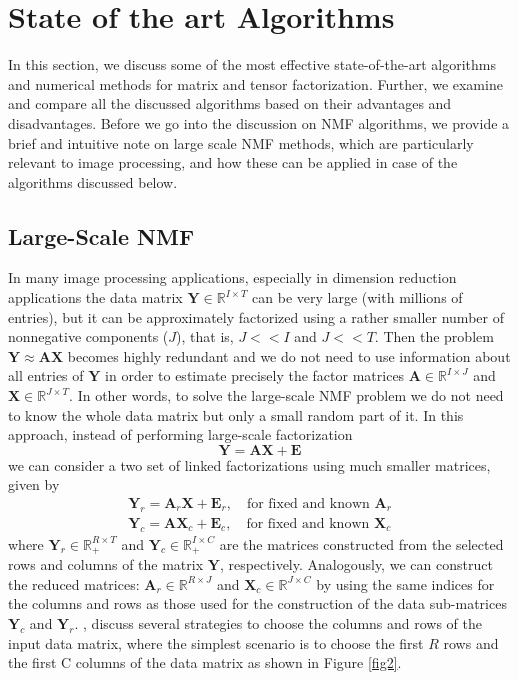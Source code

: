 \documentclass[11pt]{article}
\begin{document}
\section{State of the art Algorithms}
In this section, we discuss some of the most effective state-of-the-art algorithms and numerical methods for matrix and tensor factorization. Further, we examine and compare all the discussed algorithms based on their advantages and disadvantages. Before we go into the discussion on NMF algorithms, we provide a brief and intuitive note on large scale NMF methods, which are particularly relevant to image processing, and how these can be applied in case of the algorithms discussed below.

\subsection{Large-Scale NMF}
In many image processing applications, especially in dimension reduction applications the data matrix $\mathbf{Y} \in \mathbb{R}^{I \times T}$ can be very large (with millions of entries), but it can be approximately factorized using a rather smaller number of nonnegative components ($\mathit{J}$), that is, $\mathit{J} << I$ and $\mathit{J} << T$. Then the problem $\mathbf{Y} \approx \mathbf{AX}$ becomes highly redundant and we do not need to use information about all entries of $\mathbf{Y}$ in order to estimate precisely the factor matrices $\mathbf{A} \in \mathbb{R}^{I \times J}$ and $\mathbf{X} \in \mathbb{R}^{J \times T}$. In other words, to solve the large-scale NMF problem we do not need to know the whole data matrix but only a small random part of it. In this approach, instead of performing large-scale factorization $$\mathbf{Y} = \mathbf{AX} + \mathbf{E}$$
we can consider a two set of linked factorizations using much smaller matrices, given by
\begin{eqnarray*}
\mathbf{Y}_r = \mathbf{A}_r\mathbf{X} + \mathbf{E}_r, \quad \textrm{for fixed and known } \mathbf{A}_r \\
\mathbf{Y}_c = \mathbf{A}\mathbf{X}_c + \mathbf{E}_c, \quad \textrm{for fixed and known } \mathbf{X}_c
\end{eqnarray*}
where $\mathbf{Y}_r \in \mathbb{R}^{R \times T}_+$ and $\mathbf{Y}_c \in \mathbb{R}^{I \times C}_+$ are the matrices constructed from the selected rows and columns of the matrix $\mathbf{Y}$, respectively. Analogously, we can construct the reduced matrices: $\mathbf{A}_r \in \mathbb{R}^{R \times J}$ and $\mathbf{X}_c \in \mathbb{R}^{J \times C}$ by using the same indices for the columns and rows as those used for the construction of the data sub-matrices $\mathbf{Y}_c$ and $\mathbf{Y}_r$. \cite{66}, \cite{15} discuss several strategies to choose the columns and rows of the input data matrix, where the simplest scenario is to choose the first $R$ rows and the first C columns of the data matrix as shown in Figure \ref{fig2}.
\end{document}
